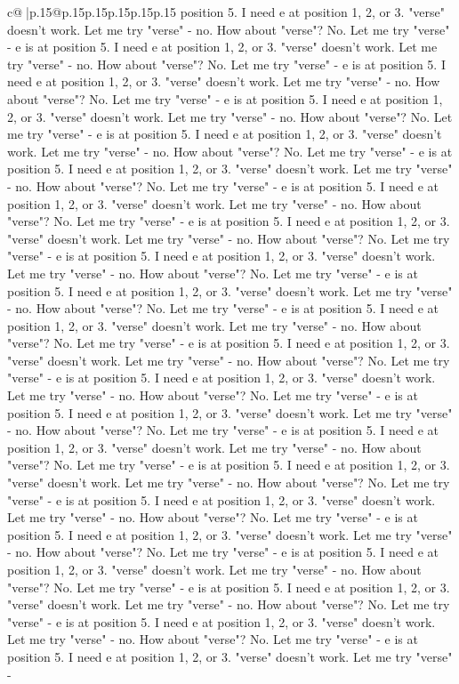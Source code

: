 \documentclass{article}
\begin{document}
{\begin{supertabular}{c@{$\;$}|p{.15\linewidth}@{}p{.15\linewidth}p{.15\linewidth}p{.15\linewidth}p{.15\linewidth}p{.15\linewidth}}
{{{position 5. I need e at position 1, 2, or 3. "verse" doesn't work. Let me try "verse" {-} no. How about "verse"? No. Let me try "verse" {-} e is at position 5. I need e at position 1, 2, or 3. "verse" doesn't work. Let me try "verse" {-} no. How about "verse"? No. Let me try "verse" {-} e is at position 5. I need e at position 1, 2, or 3. "verse" doesn't work. Let me try "verse" {-} no. How about "verse"? No. Let me try "verse" {-} e is at position 5. I need e at position 1, 2, or 3. "verse" doesn't work. Let me try "verse" {-} no. How about "verse"? No. Let me try "verse" {-} e is at position 5. I need e at position 1, 2, or 3. "verse" doesn't work. Let me try "verse" {-} no. How about "verse"? No. Let me try "verse" {-} e is at position 5. I need e at position 1, 2, or 3. "verse" doesn't work. Let me try "verse" {-} no. How about "verse"? No. Let me try "verse" {-} e is at position 5. I need e at position 1, 2, or 3. "verse" doesn't work. Let me try "verse" {-} no. How about "verse"? No. Let me try "verse" {-} e is at position 5. I need e at position 1, 2, or 3. "verse" doesn't work. Let me try "verse" {-} no. How about "verse"? No. Let me try "verse" {-} e is at position 5. I need e at position 1, 2, or 3. "verse" doesn't work. Let me try "verse" {-} no. How about "verse"? No. Let me try "verse" {-} e is at position 5. I need e at position 1, 2, or 3. "verse" doesn't work. Let me try "verse" {-} no. How about "verse"? No. Let me try "verse" {-} e is at position 5. I need e at position 1, 2, or 3. "verse" doesn't work. Let me try "verse" {-} no. How about "verse"? No. Let me try "verse" {-} e is at position 5. I need e at position 1, 2, or 3. "verse" doesn't work. Let me try "verse" {-} no. How about "verse"? No. Let me try "verse" {-} e is at position 5. I need e at position 1, 2, or 3. "verse" doesn't work. Let me try "verse" {-} no. How about "verse"? No. Let me try "verse" {-} e is at position 5. I need e at position 1, 2, or 3. "verse" doesn't work. Let me try "verse" {-} no. How about "verse"? No. Let me try "verse" {-} e is at position 5. I need e at position 1, 2, or 3. "verse" doesn't work. Let me try "verse" {-} no. How about "verse"? No. Let me try "verse" {-} e is at position 5. I need e at position 1, 2, or 3. "verse" doesn't work. Let me try "verse" {-} no. How about "verse"? No. Let me try "verse" {-} e is at position 5. I need e at position 1, 2, or 3. "verse" doesn't work. Let me try "verse" {-} no. How about "verse"? No. Let me try "verse" {-} e is at position 5. I need e at position 1, 2, or 3. "verse" doesn't work. Let me try "verse" {-} no. How about "verse"? No. Let me try "verse" {-} e is at position 5. I need e at position 1, 2, or 3. "verse" doesn't work. Let me try "verse" {-} no. How about "verse"? No. Let me try "verse" {-} e is at position 5. I need e at position 1, 2, or 3. "verse" doesn't work. Let me try "verse" {-} no. How about "verse"? No. Let me try "verse" {-} e is at position 5. I need e at position 1, 2, or 3. "verse" doesn't work. Let me try "verse" {-} no. How about "verse"? No. Let me try "verse" {-} e is at position 5. I need e at position 1, 2, or 3. "verse" doesn't work. Let me try "verse" {-} }}}
\end{supertabular}}
\end{document}
